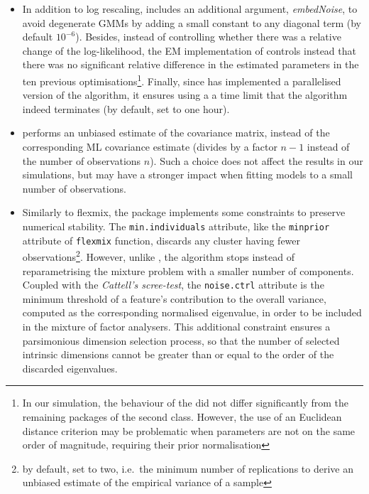 \begin{itemize}
\item
  In addition to log rescaling,  includes an additional argument, \emph{embedNoise}, to avoid degenerate GMMs by adding a small constant to any diagonal term (by default \(10^{-6}\)). Besides, instead of controlling whether there was a relative change of the log-likelihood, the EM implementation of  controls instead that there was no significant relative difference in the estimated parameters in the ten previous optimisations\footnote{In our simulation, the behaviour of the  did not differ significantly from the remaining packages of the second class. However, the use of an Euclidean distance criterion may be problematic when parameters are not on the same order of magnitude, requiring their prior normalisation}. Finally, since  has implemented a parallelised version of the algorithm, it ensures using a a time limit that the algorithm indeed terminates (by default, set to one hour).
\item
   performs an unbiased estimate of the covariance matrix, instead of the corresponding ML covariance estimate (divides by a factor \(n-1\) instead of the number of observations \(n\)). Such a choice does not affect the results in our simulations, but may have a stronger impact when fitting models to a small number of observations.
\item
  Similarly to flexmix, the  package implements some constraints to preserve numerical stability. The \texttt{min.individuals} attribute, like the \texttt{minprior} attribute of \texttt{flexmix} function, discards any cluster having fewer observations\footnote{by default, set to two, i.e.~the minimum number of replications to derive an unbiased estimate of the empirical variance of a sample}. However, unlike , the algorithm stops instead of reparametrising the mixture problem with a smaller number of components. Coupled with the \emph{Cattell's scree-test}, the \texttt{noise.ctrl} attribute is the minimum threshold of a feature's contribution to the overall variance, computed as the corresponding normalised eigenvalue, in order to be included in the mixture of factor analysers. This additional constraint ensures a parsimonious dimension selection process, so that the number of selected intrinsic dimensions cannot be greater than or equal to the order of the discarded eigenvalues.
\end{itemize}

